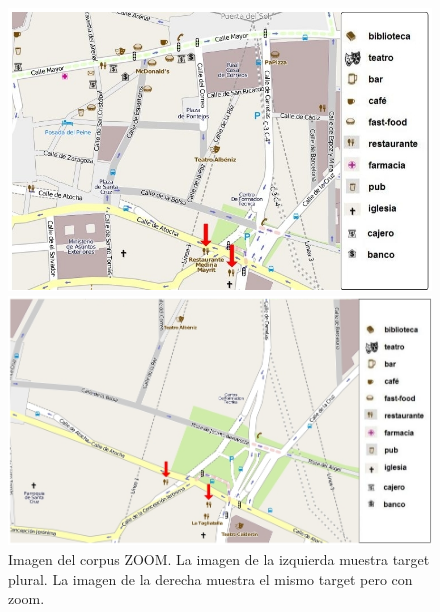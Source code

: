 \begin{figure}
\begin{minipage}[b]{0.48\linewidth}
\centering
\includegraphics[width=\textwidth]{images/corpus/mapa10.png}
\caption{}
\label{mapa17}
\end{minipage}
\hspace*{0cm}
\begin{minipage}[b]{0.55\linewidth}
\centering
\includegraphics[width=\textwidth]{images/corpus/mapa20.png}
\caption{}
\label{mapa18}
\end{minipage}
\caption{Imagen del corpus ZOOM. La imagen de la izquierda muestra target plural. La imagen de la derecha muestra el mismo target pero con zoom.}

\end{figure}


